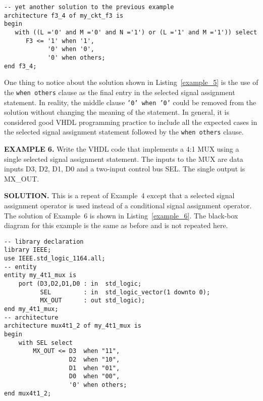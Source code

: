 \noindent
\begin{minipage}{0.99\linewidth}
\begin{lstlisting}[label=example_5, caption=Solution of Example~5.]
-- yet another solution to the previous example
architecture f3_4 of my_ckt_f3 is
begin
   with ((L ='0' and M ='0' and N ='1') or (L ='1' and M ='1')) select
      F3 <= '1' when '1',
            '0' when '0',
            '0' when others;
end f3_4;
\end{lstlisting}
\end{minipage}

One thing to notice about the solution shown in Listing~\ref{example_5} is the use of the \texttt{when others} clause as the final entry in the selected signal assignment statement. In reality, the middle clause \texttt{'0' when '0'} could be removed from the solution without changing the meaning of the statement. In general, it is considered good VHDL programming practice to include all the expected cases in the selected signal assignment statement followed by the \texttt{when others} clause.
\begin{leftbar}
\noindent
\textbf{EXAMPLE 6.}
Write the VHDL code that implements a 4:1 MUX using a single selected signal assignment statement. The inputs to the MUX are data inputs D3, D2, D1, D0 and a two-input control bus SEL. The single output is MX\_OUT.
\end{leftbar}
\noindent
\textbf{SOLUTION.} This is a repeat of Example~4 except that a selected signal assignment operator is used instead of a conditional signal assignment operator. The solution of Example~6 is shown in Listing~\ref{example_6}. The black-box diagram for this example is the same as before and is not repeated here.

\begin{lstlisting}[float, label=example_6, caption=Solution of Example~6.]
-- library declaration
library IEEE;
use IEEE.std_logic_1164.all;
-- entity
entity my_4t1_mux is
	port (D3,D2,D1,D0 : in  std_logic;
	      SEL         : in  std_logic_vector(1 downto 0);
	      MX_OUT      : out std_logic);
end my_4t1_mux;
-- architecture
architecture mux4t1_2 of my_4t1_mux is
begin
	with SEL select
		MX_OUT <= D3  when "11",
		          D2  when "10",
		          D1  when "01",
		          D0  when "00",
		          '0' when others;
end mux4t1_2;
\end{lstlisting}

